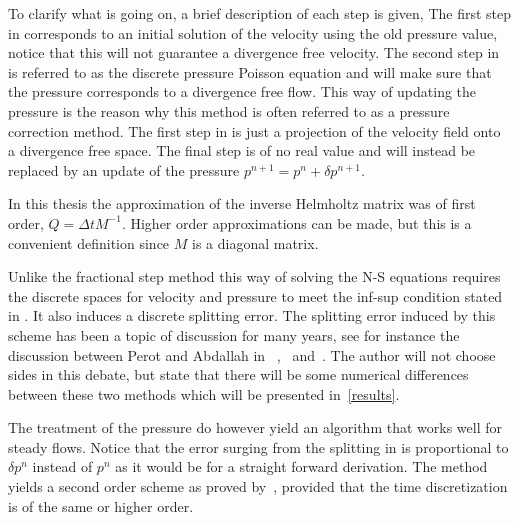 To clarify what is going on, a brief description of each step is given,
The first step in  corresponds to an initial solution of the velocity using 
the old pressure value, notice that this will not guarantee a divergence free velocity.
The second step in  is referred to as the discrete pressure Poisson equation and will 
make sure that the pressure corresponds to a divergence free flow. 
This way of updating the pressure is the reason why this method is often referred to as a pressure 
correction method.
The first step in  is just a projection of the velocity field
onto a divergence free space. The final step is of no real value and will instead be replaced 
by an update of the pressure $p^{n+1} = p^{n}+\delta p^{n+1}$.

In this thesis the approximation of the inverse Helmholtz matrix was of first order, 
$Q = \Delta t M^{-1}$. Higher order approximations can be made, but this is 
a convenient definition since $M$ is a diagonal matrix.

Unlike the fractional step method this way of solving the N-S equations  
requires the discrete spaces for velocity and pressure
to meet the inf-sup condition stated in . 
It also induces a discrete splitting error. The splitting error induced by this scheme 
has been a topic of discussion for many years, see for instance the discussion between Perot and Abdallah in
~\cite{Perot},~\cite{Abdallah} and~\cite{Perotcomments}. The author will not choose sides in this debate, 
but state that there will be some numerical differences between these two methods which will be presented 
in~\cref{results}.

The treatment of the pressure do however yield an algorithm that works well for steady flows.
Notice that the error surging from the splitting in 
is proportional to $\delta p^n$ instead of $p^n$ as it would be for a straight forward derivation. 
The method yields a second order scheme as proved by~\cite{vanKan},
provided that the time discretization is of the same or higher order.

